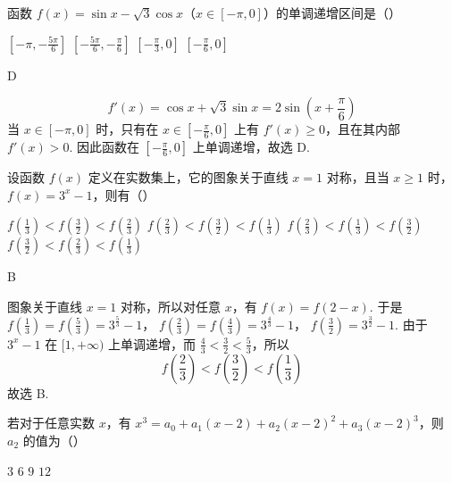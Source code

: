 \begin{problem}
函数 \(f(x) = \sin x - \sqrt{3}\cos x\)（\(x \in [-\pi, 0]\)）的单调递增区间是（\quad）

\choices
    {\(\left[-\pi, -\frac{5\pi}{6}\right]\)}
    {\(\left[-\frac{5\pi}{6}, -\frac{\pi}{6}\right]\)}
    {\(\left[-\frac{\pi}{3}, 0\right]\)}
    {\(\left[-\frac{\pi}{6}, 0\right]\)}
\end{problem}

\begin{answer}
D
\end{answer}

\begin{solution}
\[
f'(x)=\cos x+\sqrt{3}\sin x=2\sin\left(x+\frac{\pi}{6}\right)
\]
当 \(x\in[-\pi,0]\) 时，只有在 \(x\in[-\frac{\pi}{6},0]\) 上有 \(f'(x)\geqslant0\)，且在其内部 \(f'(x)>0\). 因此函数在 \([-\frac{\pi}{6},0]\) 上单调递增，故选 D.
\end{solution}

\begin{problem}
设函数 \(f(x)\) 定义在实数集上，它的图象关于直线 \(x = 1\) 对称，且当 \(x \geqslant 1\) 时，\(f(x) = 3^{x} - 1\)，则有（\quad）

\choices
    {\(f\left(\frac{1}{3}\right) < f\left(\frac{3}{2}\right) < f\left(\frac{2}{3}\right)\)}
    {\(f\left(\frac{2}{3}\right) < f\left(\frac{3}{2}\right) < f\left(\frac{1}{3}\right)\)}
    {\(f\left(\frac{2}{3}\right) < f\left(\frac{1}{3}\right) < f\left(\frac{3}{2}\right)\)}
    {\(f\left(\frac{3}{2}\right) < f\left(\frac{2}{3}\right) < f\left(\frac{1}{3}\right)\)}
\end{problem}

\begin{answer}
B
\end{answer}

\begin{solution}
图象关于直线 \(x=1\) 对称，所以对任意 \(x\)，有 \(f(x)=f(2-x)\). 于是
\(f\left(\frac{1}{3}\right)=f\left(\frac{5}{3}\right)=3^{\frac{5}{3}}-1\)，
\(f\left(\frac{2}{3}\right)=f\left(\frac{4}{3}\right)=3^{\frac{4}{3}}-1\)，
\(f\left(\frac{3}{2}\right)=3^{\frac{3}{2}}-1\).
由于 \(3^x-1\) 在 \([1,+\infty)\) 上单调递增，而 \(\frac{4}{3}<\frac{3}{2}<\frac{5}{3}\)，所以
\[
f\left(\frac{2}{3}\right)<f\left(\frac{3}{2}\right)<f\left(\frac{1}{3}\right)
\]
故选 B.
\end{solution}

\begin{problem}
若对于任意实数 \(x\)，有
\(x^{3} = a_{0} + a_{1}(x - 2) + a_{2}(x - 2)^{2} + a_{3}(x - 2)^{3}\)，则 \(a_{2}\) 的值为（\quad）

\choices
    {\(3\)}
    {\(6\)}
    {\(9\)}
    {\(12\)}
\end{problem}


